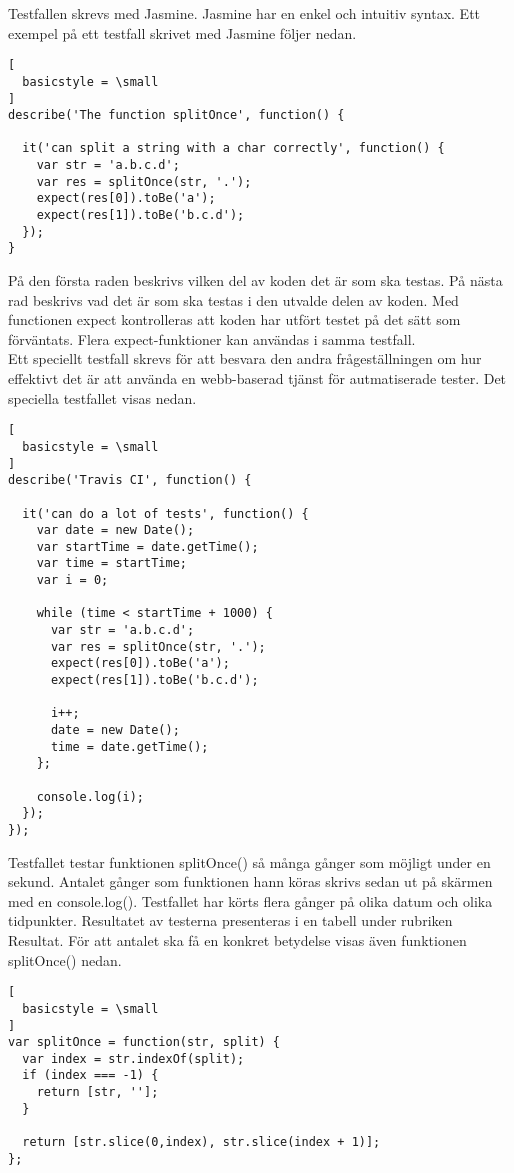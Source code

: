 Testfallen skrevs med Jasmine. Jasmine har en enkel och intuitiv syntax.
Ett exempel på ett testfall skrivet med Jasmine följer nedan.

\begin{lstlisting}[
  basicstyle = \small
]
describe('The function splitOnce', function() {
	
  it('can split a string with a char correctly', function() {
    var str = 'a.b.c.d';
    var res = splitOnce(str, '.');
    expect(res[0]).toBe('a');
    expect(res[1]).toBe('b.c.d');
  });
}
\end{lstlisting}

På den första raden beskrivs vilken del av koden det är som ska testas.
På nästa rad beskrivs vad det är som ska testas i den utvalde delen av koden.
Med functionen expect kontrolleras att koden har utfört testet på det sätt
som förväntats. Flera expect-funktioner kan användas i samma testfall.\\

Ett speciellt testfall skrevs
för att besvara den andra frågeställningen om hur effektivt det är 
att använda en webb-baserad tjänst
för autmatiserade tester. Det speciella testfallet visas nedan.

\begin{lstlisting}[
  basicstyle = \small
]
describe('Travis CI', function() {
	
  it('can do a lot of tests', function() {
    var date = new Date();
    var startTime = date.getTime();
    var time = startTime;
    var i = 0;

    while (time < startTime + 1000) {  
      var str = 'a.b.c.d';
      var res = splitOnce(str, '.');
      expect(res[0]).toBe('a');
      expect(res[1]).toBe('b.c.d');

      i++;
      date = new Date(); 
      time = date.getTime();
    };

    console.log(i);
  });
});
\end{lstlisting}

Testfallet testar funktionen splitOnce() så många gånger som möjligt
under en sekund. Antalet gånger som funktionen hann köras skrivs
sedan ut på skärmen med en console.log(). 
Testfallet har körts flera gånger på olika datum och olika tidpunkter.
Resultatet av testerna presenteras i en tabell under rubriken Resultat.
För att antalet ska
få en konkret betydelse visas även funktionen splitOnce() nedan.

\begin{lstlisting}[
  basicstyle = \small
]
var splitOnce = function(str, split) {
  var index = str.indexOf(split);
  if (index === -1) {
    return [str, ''];
  }

  return [str.slice(0,index), str.slice(index + 1)];
};
\end{lstlisting}

